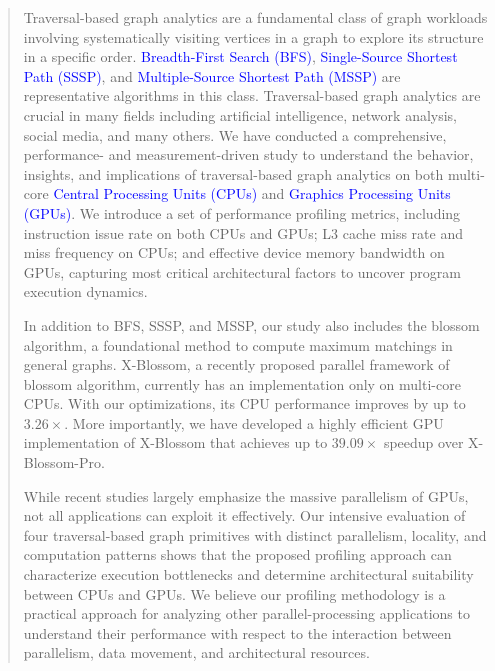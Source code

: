 \begin{abstract}

Traversal-based graph analytics are a fundamental class of graph workloads involving systematically visiting vertices in a graph to explore its structure in a specific order. \textcolor{blue}{Breadth-First Search (BFS)}, \textcolor{blue}{Single-Source Shortest Path (SSSP)}, and \textcolor{blue}{Multiple-Source Shortest Path (MSSP)} are representative algorithms in this class. Traversal-based graph analytics are crucial in many fields including artificial intelligence, network analysis, social media, and many others.  We have conducted a comprehensive, performance- and measurement-driven study to understand the behavior, insights, and implications of traversal-based graph analytics on both multi-core \label{para:first-cpu-gpu}\textcolor{blue}{Central Processing Units (CPUs)} and \textcolor{blue}{Graphics Processing Units (GPUs)}. 
We introduce a set of performance profiling metrics, including instruction issue rate on both CPUs and GPUs; L3 cache miss rate and miss frequency on CPUs; and effective device memory bandwidth on GPUs, capturing most critical architectural factors to uncover program execution dynamics. 

In addition to BFS, SSSP, and MSSP, our study also includes the blossom algorithm, a foundational method to compute maximum matchings in general graphs.  X-Blossom, a recently proposed parallel framework of blossom algorithm, currently has an implementation only on multi-core CPUs. With our optimizations, its CPU performance improves by up to $3.26\times$. More importantly, we have developed a highly efficient GPU implementation of X-Blossom that achieves up to $39.09\times$ speedup over X-Blossom-Pro. 

While recent studies largely emphasize the massive parallelism of GPUs, not all applications can exploit it effectively.
Our intensive evaluation of four traversal-based graph primitives with distinct parallelism, locality, and computation patterns shows that the proposed profiling approach can characterize execution bottlenecks and determine architectural suitability between CPUs and GPUs.
We believe our profiling methodology is a practical approach for analyzing other parallel-processing applications to understand their performance with respect to the interaction between parallelism, data movement, and architectural resources.


\end{abstract}
